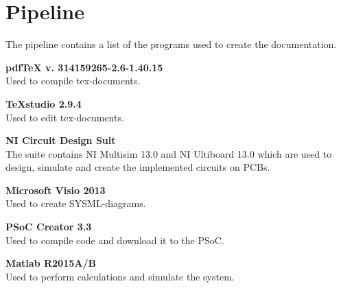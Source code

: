 \section{Pipeline}
The pipeline contains a list of the programs used to create the documentation.

\textbf{pdfTeX v. 314159265-2.6-1.40.15}\\
Used to compile tex-documents.

\textbf{TeXstudio 2.9.4}\\
Used to edit tex-documents.

\textbf{NI Circuit Design Suit}\\
The suite contains NI Multisim 13.0 and NI Ultiboard 13.0 which are used to design, simulate and create the implemented circuits on PCBs.

\textbf{Microsoft Visio 2013}\\
Used to create SYSML-diagrams.

\textbf{PSoC Creator 3.3}\\
Used to compile code and download it to the PSoC.

\textbf{Matlab R2015A/B}\\
Used to perform calculations and simulate the system.
